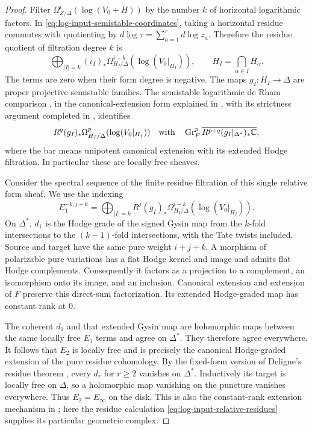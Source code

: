 \begin{proof}
Filter $\Omega^i_{Z/\Delta}(\log(V_0+H))$ by the number $k$ of
horizontal logarithmic factors.  In
\eqref{eq:log-input-semistable-coordinates}, taking a horizontal
residue commutes with quotienting by
$d\log\tau=\sum_{a=1}^r d\log z_a$.  Therefore the residue
quotient of filtration degree $k$ is
\begin{equation}\label{eq:log-input-relative-residues}
 \bigoplus_{|I|=k}
 (\iota_I)_*\Omega^{i-k}_{H_I/\Delta}(\log(V_0|_{H_I})),
 \qquad H_I=\bigcap_{\alpha\in I}H_\alpha.
\end{equation}
The terms are zero when their form degree is negative.
The maps $g_I:H_I\to\Delta$ are proper projective semistable
families.  The semistable logarithmic de Rham comparison
\cite[\S2, Theorem~2.7, Corollaries~2.9--2.10 and
Theorem~2.11]{Steenbrink77}, in the canonical-extension form explained
in \cite[\S4.9 and the proof of Lemma~4.10, Step~1]{FF14}, with its
strictness argument completed in \cite{FF14Remark}, identifies
\[
 R^q(g_I)_*\Omega^p_{H_I/\Delta}(\log(V_0|_{H_I}))
 \quad\text{with}\quad
 \operatorname{Gr}_F^p\overline{R^{p+q}(g_I|_{\Delta^*})_*\mathbb C},
\]
where the bar means unipotent canonical extension with its
extended Hodge filtration.  In particular these are locally
free sheaves.

Consider the spectral sequence of the finite residue filtration
of this single relative form sheaf.  We use the indexing
\[
 E_1^{-k,j+k}=
 \bigoplus_{|I|=k}R^j(g_I)_*
 \Omega^{i-k}_{H_I/\Delta}(\log(V_0|_{H_I})).
\]
On $\Delta^*$, $d_1$ is the Hodge grade of the signed Gysin
map from the $k$-fold intersections to the $(k-1)$-fold
intersections, with the Tate twists included.  Source and
target have the same pure weight $i+j+k$.  A morphism of
polarizable pure variations has a flat Hodge kernel and image
and admits flat Hodge complements.  Consequently it factors
as a projection to a complement, an isomorphism onto its image,
and an inclusion.  Canonical extension and extension of $F$
preserve this direct-sum factorization.  Its extended
Hodge-graded map has constant rank at $0$.

The coherent $d_1$ and that extended Gysin map are holomorphic
maps between the same locally free $E_1$ terms and agree on
$\Delta^*$.  They therefore agree everywhere.  It follows that
$E_2$ is locally free and is precisely the canonical
Hodge-graded extension of the pure residue cohomology.
By the fixed-form version of Deligne's residue theorem
\cite[Corollary~3.2.13(iii)]{DeligneHodgeII}, every $d_r$ for
$r\ge2$ vanishes on $\Delta^*$.  Inductively its target is
locally free on $\Delta$, so a holomorphic map vanishing on
the puncture vanishes everywhere.  Thus $E_2=E_\infty$ on
the disk.  This is also the constant-rank extension mechanism
in \cite[Proposition~3.12 and the proof of Lemma~4.10,
Step~1]{FF14}; here the residue calculation
\eqref{eq:log-input-relative-residues} supplies its particular
geometric complex.


\end{proof}
